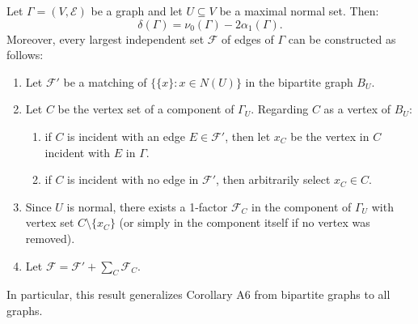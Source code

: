 Let $\Gamma = (V, \mathcal{E})$ be a graph and let $U \subseteq V$ be a maximal normal set. Then:
$$\delta(\Gamma) = \nu_0(\Gamma) - 2\alpha_1(\Gamma).$$
Moreover, every largest independent set $\mathcal{F}$ of edges of $\Gamma$ can be constructed as follows:

\begin{enumerate}
\item[(a)] Let $\mathcal{F}'$ be a matching of $\{\{x\}: x \in N(U)\}$ in the bipartite graph $B_U$.

\item[(b)] Let $C$ be the vertex set of a component of $\Gamma_U$. Regarding $C$ as a vertex of $B_U$:
\begin{enumerate}
\item[(i)] if $C$ is incident with an edge $E \in \mathcal{F}'$, then let $x_C$ be the vertex in $C$ incident with $E$ in $\Gamma$.
\item[(ii)] if $C$ is incident with no edge in $\mathcal{F}'$, then arbitrarily select $x_C \in C$.
\end{enumerate}

\item[(c)] Since $U$ is normal, there exists a 1-factor $\mathcal{F}_C$ in the component of $\Gamma_U$ with vertex set $C \setminus \{x_C\}$ (or simply in the component itself if no vertex was removed).

\item[(d)] Let $\mathcal{F} = \mathcal{F}' + \sum_C \mathcal{F}_C$.
\end{enumerate}

In particular, this result generalizes Corollary A6 from bipartite graphs to all graphs.
